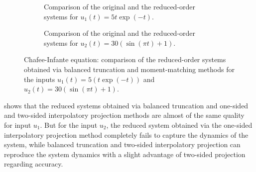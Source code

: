 \begin{figure}[!htb]
        \centering
 \begin{subfigure}[!b]{\textwidth}
  \centering
		\setlength\fheight{3cm}
	\setlength\fwidth{5.0cm}
			\caption{Comparison of the original and the reduced-order systems for $u_1(t) = 5\left.t\exp(-t)\right.$. }
			\label{fig:chafee_input2}
 \end{subfigure}
  \begin{subfigure}[!tb]{\textwidth}
  	\centering
  	\setlength\fheight{3cm}
  	\setlength\fwidth{5.0cm}
  				\caption{Comparison of the original and the reduced-order systems for $u_2(t) = 30\left(\sin(\pi t)+1\right)$. }
  \end{subfigure}
 \caption{Chafee-Infante equation: comparison of the reduced-order systems obtained via balanced truncation and moment-matching methods for the inputs $u_1(t) = 5\left(t\exp(-t)\right)$  and $u_2(t) = 30\left(\sin(\pi t)+1\right)$. }
\label{fig:time_domain_CI}
\end{figure}

 shows that the reduced systems obtained via balanced truncation and one-sided and two-sided interpolatory projection methods are almost  of the same quality for input $u_1$. But for the input $u_2$, the reduced system obtained via the one-sided interpolatory projection method completely fails to capture the dynamics of the system, while balanced truncation and two-sided interpolatory projection can reproduce the system dynamics with a slight advantage of two-sided projection regarding accuracy.


